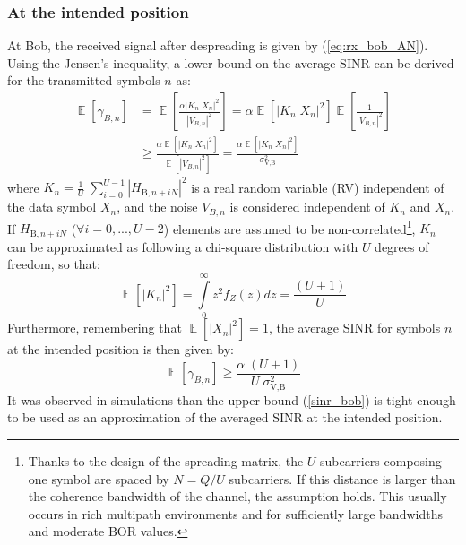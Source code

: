\documentclass[conference]{IEEEtran}
\begin{document}
\subsubsection{At the intended position}
At Bob, the received signal after despreading is given by (\ref{eq:rx_bob_AN}). Using the Jensen's inequality, a lower bound on the average SINR can be derived for the transmitted symbols $n$ as:
\begin{equation}
\begin{split}
    \mathop{\mathbb{E}} \left[\gamma_{B,n}\right] &= \mathop{\mathbb{E}} \left[ \frac{  \alpha \left| K_n \; X_n\right|^2  }{  \left| V_{B,n} \right|^2}  \right]  = \alpha \mathop{\mathbb{E}} \left[ \left| K_n \; X_n\right|^2 \right]  \mathop{\mathbb{E}} \left[ \frac{1}{\left| V_{B,n} \right|^2} \right]  \\
    & \geq  \frac{\alpha \mathop{\mathbb{E}} \left[ \left| K_n \; X_n\right|^2 \right] }{\mathop{\mathbb{E}} \left[ \left| V_{B,n} \right|^2 \right]} =  \frac{\alpha \mathop{\mathbb{E}} \left[ \left| K_n \; X_n\right|^2 \right] }{\sigma^2_{\text{V,B}}}
    \label{eq:RV_sinr_b}
\end{split}
\end{equation}
where $K_n = \frac{1}{U}\; \sum_{i=0}^{U-1} \left| H_{\text{B}, n + iN}\right|^2$ is a real random variable (RV) independent of the data symbol $X_n$, and the noise $V_{B,n}$ is considered independent of $K_n$ and $X_n$. If $H_{\text{B}, n + iN}$ ($\forall i = 0,...,U-2$) elements are assumed to be non-correlated\footnote{Thanks to the design of the spreading matrix, the $U$ subcarriers composing one symbol are spaced by $N = Q/U$ subcarriers. If this distance is larger than the coherence bandwidth of the channel, the assumption holds. This usually occurs in rich multipath environments and for sufficiently large bandwidths and moderate BOR values.}, $K_n$   can be approximated as following a chi-square  distribution with $U$ degrees of freedom, so that: 
\begin{equation}
    \mathop{\mathbb{E}}\left[ \left| K_n \right|^2\right] = \int \limits_{0}^{\infty} z^2  f_Z(z) dz  = \frac{(U+1)}{U}
\end{equation}
 Furthermore, remembering that $\mathop{\mathbb{E}}\left[ \left| X_n \right|^2\right] = 1$, the average SINR for symbols $n$ at the intended position is then given by:
\begin{equation}
    \mathop{\mathbb{E}} \left[\gamma_{B,n}\right] \geq \frac{\alpha \;(U+1)}{U \; \sigma_{\text{V,B}}^2}
    \label{sinr_bob}
\end{equation}
It was observed in simulations than the upper-bound (\ref{sinr_bob}) is tight enough to be used as an approximation of the averaged SINR at the intended position. 
\end{document}
